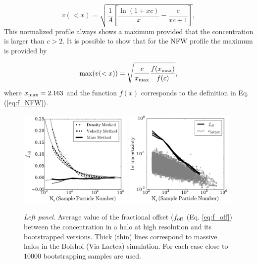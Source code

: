 \documentclass{emulateapj}
\begin{document}
\begin{equation}
v(<x)=\sqrt{\frac{1}{A}\left[\frac{\ln\left(1+xc\right)}{x}-\frac{c}{xc+1}\right]},
\end{equation}
%
This normalized profile always shows a maximum provided that the
concentration is larger than $c>2$.  It is possible to show that for
the NFW profile the maximum is provided by

\begin{equation}
\mathrm{max}(v(<x)) = \sqrt{\frac{c}{x_{\rm max}}\frac{f(x_{\rm
      max})}{f(c)}},
\label{eq:max_v}
\end{equation}
where $x_{\rm max}=2.163$ \citep{Klypin2016} and the function $f(x)$
corresponds to the definition in Eq. (\ref{eq:f_NFW}).


\begin{figure}
\begin{center}
  \includegraphics[width=0.49\textwidth]{avg_foff_bolshoi.pdf}
  \includegraphics[width=0.48\textwidth]{sigma_foff_bolshoi.pdf}
\end{center}
\vspace{-0.5cm}
\caption{\emph{Left panel}. Average value of the fractional offset ($f_{\rm
    off}$ (Eq. \ref{eq:f_off}) between the concentration in a halo at 
  high resolution and its bootstrapped versions. 
  Thick (thin) lines correspond to massive halos in the Bolshoi (Via
  Lactea) simulation.
  For each case close to $10000$ bootstrapping samples are used.
}
\end{figure}
\end{document}
